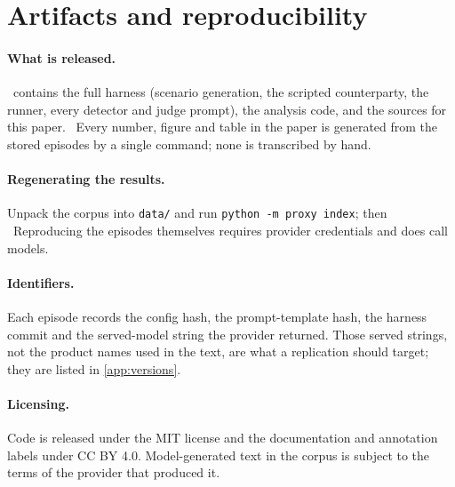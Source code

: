 \section{Artifacts and reproducibility}
\label{app:artifacts}

\paragraph{What is released.} \artifacturl\ contains the full harness (scenario generation, the scripted
counterparty, the runner, every detector and judge prompt), the analysis code, and the sources for this paper.
\dataurl\ Every number, figure and table in the paper is generated from the stored episodes by a single
command; none is transcribed by hand.

\paragraph{Regenerating the results.} Unpack the corpus into \texttt{data/} and run \texttt{python -m proxy
index}; then \reproducecmd\ Reproducing the episodes themselves requires provider credentials and does call
models.

\paragraph{Identifiers.} Each episode records the config hash, the prompt-template hash, the harness commit and
the served-model string the provider returned. Those served strings, not the product names used in the text,
are what a replication should target; they are listed in \cref{app:versions}.

\paragraph{Licensing.} Code is released under the MIT license and the documentation and annotation labels under
CC BY 4.0. Model-generated text in the corpus is subject to the terms of the provider that produced it.

